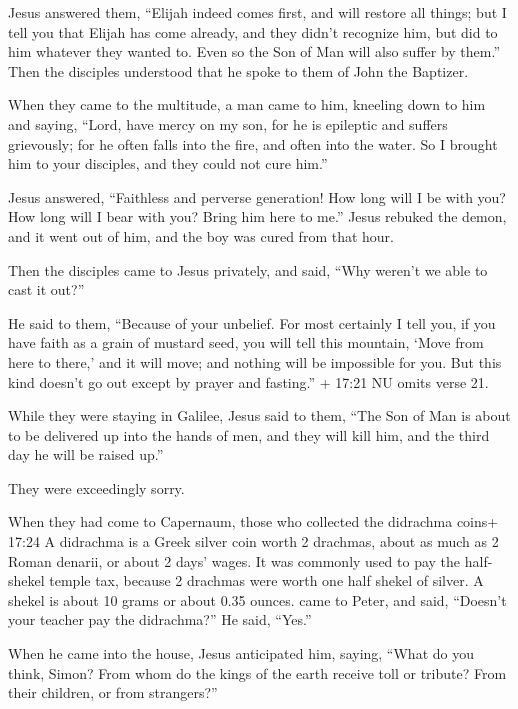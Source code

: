  Jesus answered them, ``Elijah indeed comes first, and will
restore all things;  but I tell you that Elijah has come
already, and they didn't recognize him, but did to him whatever they
wanted to. Even so the Son of Man will also suffer by them.''
 Then the disciples understood that he spoke to them of
John the Baptizer.

 When they came to the multitude, a man came to him,
kneeling down to him and saying,  ``Lord, have mercy on my
son, for he is epileptic and suffers grievously; for he often falls into
the fire, and often into the water.  So I brought him to
your disciples, and they could not cure him.''

 Jesus answered, ``Faithless and perverse generation! How
long will I be with you? How long will I bear with you? Bring him here
to me.''  Jesus rebuked the demon, and it went out of him,
and the boy was cured from that hour.

 Then the disciples came to Jesus privately, and said,
``Why weren't we able to cast it out?''

 He said to them, ``Because of your unbelief. For most
certainly I tell you, if you have faith as a grain of mustard seed, you
will tell this mountain, `Move from here to there,' and it will move;
and nothing will be impossible for you.  But this kind
doesn't go out except by prayer and fasting.'' + 17:21 NU omits verse
21.

 While they were staying in Galilee, Jesus said to them,
``The Son of Man is about to be delivered up into the hands of men,
 and they will kill him, and the third day he will be
raised up.''

They were exceedingly sorry.

 When they had come to Capernaum, those who collected the
didrachma coins+ 17:24 A didrachma is a Greek silver coin worth 2
drachmas, about as much as 2 Roman denarii, or about 2 days' wages. It
was commonly used to pay the half-shekel temple tax, because 2 drachmas
were worth one half shekel of silver. A shekel is about 10 grams or
about 0.35 ounces. came to Peter, and said, ``Doesn't your teacher pay
the didrachma?''  He said, ``Yes.''

When he came into the house, Jesus anticipated him, saying, ``What do
you think, Simon? From whom do the kings of the earth receive toll or
tribute? From their children, or from strangers?''

